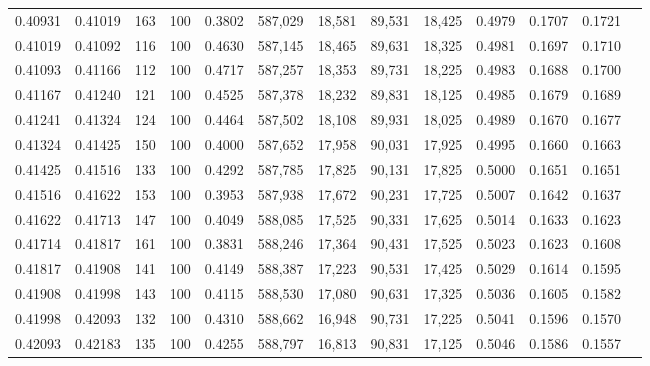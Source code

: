 \begin{tabular}{rrrrrrrrrrrrr}
0.40931 & 0.41019 &   163 & 100 &                                     0.3802 & 587,029 &  18,581 &  89,531 &  18,425 & 0.4979 & 0.1707 & 0.1721 \\
0.41019 & 0.41092 &   116 & 100 &                                     0.4630 & 587,145 &  18,465 &  89,631 &  18,325 & 0.4981 & 0.1697 & 0.1710 \\
0.41093 & 0.41166 &   112 & 100 &                                     0.4717 & 587,257 &  18,353 &  89,731 &  18,225 & 0.4983 & 0.1688 & 0.1700 \\
0.41167 & 0.41240 &   121 & 100 &                                     0.4525 & 587,378 &  18,232 &  89,831 &  18,125 & 0.4985 & 0.1679 & 0.1689 \\
0.41241 & 0.41324 &   124 & 100 &                                     0.4464 & 587,502 &  18,108 &  89,931 &  18,025 & 0.4989 & 0.1670 & 0.1677 \\
0.41324 & 0.41425 &   150 & 100 &                                     0.4000 & 587,652 &  17,958 &  90,031 &  17,925 & 0.4995 & 0.1660 & 0.1663 \\
0.41425 & 0.41516 &   133 & 100 &                                     0.4292 & 587,785 &  17,825 &  90,131 &  17,825 & 0.5000 & 0.1651 & 0.1651 \\
0.41516 & 0.41622 &   153 & 100 &                                     0.3953 & 587,938 &  17,672 &  90,231 &  17,725 & 0.5007 & 0.1642 & 0.1637 \\
0.41622 & 0.41713 &   147 & 100 &                                     0.4049 & 588,085 &  17,525 &  90,331 &  17,625 & 0.5014 & 0.1633 & 0.1623 \\
0.41714 & 0.41817 &   161 & 100 &                                     0.3831 & 588,246 &  17,364 &  90,431 &  17,525 & 0.5023 & 0.1623 & 0.1608 \\
0.41817 & 0.41908 &   141 & 100 &                                     0.4149 & 588,387 &  17,223 &  90,531 &  17,425 & 0.5029 & 0.1614 & 0.1595 \\
0.41908 & 0.41998 &   143 & 100 &                                     0.4115 & 588,530 &  17,080 &  90,631 &  17,325 & 0.5036 & 0.1605 & 0.1582 \\
0.41998 & 0.42093 &   132 & 100 &                                     0.4310 & 588,662 &  16,948 &  90,731 &  17,225 & 0.5041 & 0.1596 & 0.1570 \\
0.42093 & 0.42183 &   135 & 100 &                                     0.4255 & 588,797 &  16,813 &  90,831 &  17,125 & 0.5046 & 0.1586 & 0.1557 \\

\end{tabular}
